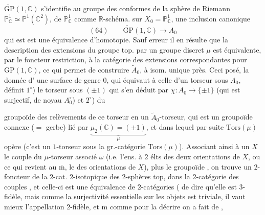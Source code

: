 $\widetilde{\mathrm{GP}}(1,\mathbb C)$ s'identifie au groupe des  conformes
de la sphère de Riemann  $\mathbb P^1_{\mathbb C}\simeq\mathbb P^1(\mathbb C^2)$,
  de $\mathbb P^1_{\mathbb C}$ comme $\mathbb R$-schéma.
 sur $X_0=\mathbb P^1_{\mathbb C}$, 
une inclusion canonique
\[
(64)\qquad \widetilde{\mathrm{GP}}(1,\mathbb C)\longrightarrow A_0
\]
qui est  est une
équivalence d'homotopie. Sauf erreur
il en résulte  que la description des
extensions du groupe top.  par un groupe
discret $\mu$ est équivalente, par le foncteur
restriction, à la catégorie des extensions
correspondantes pour  $\mathrm{GP}(1,\mathbb C)$, ce qui
permet de construire $\widetilde A_0$, à isom.
unique près. Ceci posé, la donnée d'
une surface  de genre $0$, qui équivaut
à celle d'un torseur \unsure{$[\mathrm{Isom}(\mathbb P^1_{\mathbb C},X))$|$(\mathrm{Isom}(\mathbb P^1_{\mathbb C},X))$}
sous $A_0$, définit $1^\circ$) le torseur sous
$(\pm1)$ qui s'en déduit par $\chi:A_0\longrightarrow\{\pm1\}$
(qui est surjectif, de noyau $A_0^\circ$) et \unsure{$\varphi$} $2^\circ$) du

groupoïde des relèvements de ce 
torseur en un $\widetilde A_0$-torseur, qui est
un groupoïde connexe ($=$ gerbe) lié par 
$\underbrace{\mu_2(\mathbb C)=(\pm1)}_{\mu}$,
et dans lequel par suite $\mathrm{Tors}(\mu)$  opère
(c'est un $1$-torseur sous la gr.-catégorie
$\mathrm{Tors}(\mu)$). Associant ainsi à un $X$
le couple  du $\mu$-torseur associé $\omega$
(i.e. l'ens. à $2$ élts des deux orientations de
$X$, ou ce qui revient au $\overline{\mathrm m}$, le 
des orientations de $X$), plus le \inserted{$\mu$-}groupoïde
, on trouve un $2$-foncteur de la
$2$-cat. $2$-isotopique des $2$-sphères top,
dans la $2$-catégorie des couples ,
et celle-ci est une équivalence de
$2$-catégories ( 
 de dire qu'elle est $3$-fidèle,
mais comme  la surjectivité essentielle
sur les objets est triviale, il vaut mieux
l'appellation $2$-fidèle, et $\overline{\mathrm m}$ comme pour
la décrire on a fait  de ,

